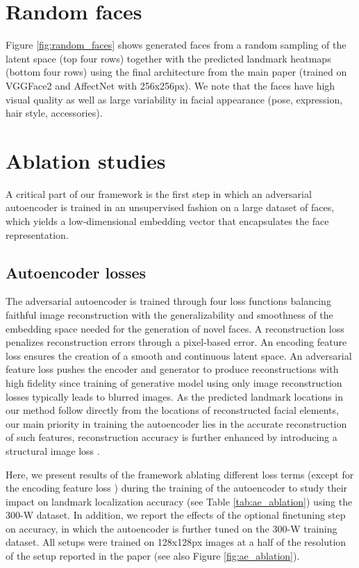 \documentclass[10pt,twocolumn,letterpaper]{article}
\begin{document}
\section{Random faces}\label{random} \vspace{-0.2cm}
Figure \ref{fig:random_faces} shows generated faces from a random sampling of the latent space (top four rows) together with the predicted landmark heatmaps (bottom four rows) using the final architecture from the main paper (trained on VGGFace2 and AffectNet with 256x256px). We note that the faces have high visual quality as well as large variability in facial appearance (pose, expression, hair style, accessories).


\section{Ablation studies}\label{ablation}

A critical part of our framework is the first step in which an adversarial autoencoder is trained in an unsupervised fashion on a large dataset of faces, which yields a low-dimensional embedding vector  that encapsulates the face representation. 

\subsection{Autoencoder losses}\label{losses}


The adversarial autoencoder is trained through four loss functions balancing faithful image reconstruction with the generalizability and smoothness of the embedding space needed for the generation of novel faces. A reconstruction loss  penalizes reconstruction errors through a pixel-based  error. An encoding feature loss  \cite{goodfellow2014generative} ensures the creation of a smooth and continuous latent space. An adversarial feature loss   pushes the encoder  and generator  to produce reconstructions with high fidelity since training of generative model using only image reconstruction losses typically leads to blurred images. As the predicted landmark locations in our method follow directly from the locations of reconstructed facial elements, our main priority in training the autoencoder lies in the accurate reconstruction of such features, reconstruction accuracy is further enhanced by introducing a structural image loss  . 

Here, we present results of the framework ablating different loss terms (except for the encoding feature loss ) during the training of the autoencoder to study their impact on landmark localization accuracy (see Table \ref{tab:ae_ablation}) using the 300-W dataset. In addition, we report the effects of the optional finetuning step on accuracy, in which the autoencoder is further tuned on the 300-W training dataset. All setups were trained on 128x128px images at a half of the resolution of the setup reported in the paper (see also Figure \ref{fig:ae_ablation}).
\end{document}
